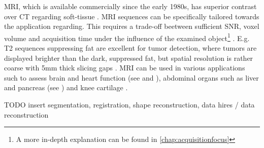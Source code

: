         \ac{MRI}, which is available commercially since the early 1980s, has superior contrast over CT regarding soft-tissue \citep{abramson2023surgeons, kabasawa2022mr}. \ac{MRI} sequences can be specifically tailored towards the application regarding. This requires a trade-off beetween sufficient \ac{SNR}, voxel volume and acquisition time under the influence of the examined object\footnote{A more in-depth explanation can be found in \ref{chap:acquisitionfocus}} \citep{macovski1996noise}. E.g. T2 sequences suppressing fat are excellent for tumor detection, where tumors are displayed brighter than the dark, suppressed fat, but spatial resolution is rather coarse with 5mm thick slicing gaps \citep{abramson2023surgeons}.
        \ac{MRI} can be used in various applications such to assess brain and heart function (see  and ), abdominal organs such as liver and pancreas (see ) and knee cartilage \citep{mazurowski2019deep}.

        TODO insert segmentation, registration, shape reconstruction, data hires / data reconstruction







